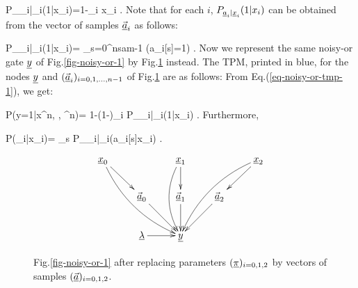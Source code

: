 \beq
P_{\rva_i|\rvx_i}(1|x_i)=1-\pi_i x_i
\;.
\eeq
Note that for each $i$,
$P_{{\underline{a}}_i|{\underline{x}}_i}(1|x_i)$
can be 
obtained
from the vector of samples
$\vec{{\underline{a}}}_i$ 
as follows:


\beq\color{blue}
P_{\rva_i|\rvx_i}(1|x_i)=
\sum_{s=0}^{nsam-1} \indi(a_i[s]=1)
\;.
\eeq
Now we represent 
the same noisy-or gate ${\underline{y}}$
of 
Fig.\ref{fig-noisy-or-1}
by 
Fig.\ref{fig-noisy-or-2}
instead.
The TPM, printed in blue,
for  
the nodes ${\underline{y}}$
and $(\vec{{\underline{a}}}_i)_{i=0,1,\ldots, n-1}$
of Fig.\ref{fig-noisy-or-2} are  as follows:
From Eq.(\ref{eq-noisy-or-tmp-1}),
we get:

\beq\color{blue}
P(y=1|x^n, \lam, \veca^n)=
1-(1-\lam)\prod_i P_{\rva_i|\rvx_i}(1|x_i)
\;.
\eeq
Furthermore, 

\beq\color{blue}
P(\veca_i|x_i)=
\prod_s P_{\rva_i|\rvx_i}(a_i[s]\cond x_i)
\;.
\eeq

\begin{figure}[h!]
$$\xymatrix{
\rvx_0\ar[dr]\ar@/_1pc/[ddrr]
&&\rvx_1\ar[d]\ar@/_1pc/[dd]
&&\rvx_2\ar@/_1pc/[ddll]\ar[dl]
\\
&\vec{\rva}_0\ar[dr]
&\vec{\rva}_1\ar[d]
&\vec{\rva}_2\ar[dl]
\\
&\ul{\lam}\ar[r]
&\rvy
}$$
\caption{ Fig.\ref{fig-noisy-or-1}
after replacing parameters 
$(\underline{\pi})_{i=0,1,2}$
by 
vectors 
of samples $(\vec{{\underline{a}}})_{i=0,1,2}$.}
\label{fig-noisy-or-2}
\end{figure}